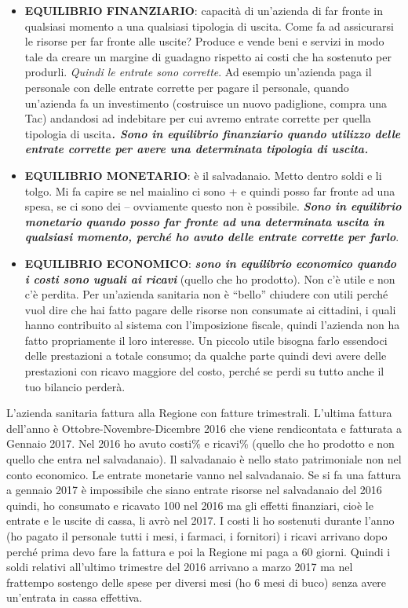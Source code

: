 \begin{itemize}
\item
  \textbf{EQUILIBRIO FINANZIARIO}: capacità di un'azienda di far fronte
  in qualsiasi momento a una qualsiasi tipologia di uscita. Come fa ad
  assicurarsi le risorse per far fronte alle uscite? Produce e vende
  beni e servizi in modo tale da creare un margine di guadagno rispetto
  ai costi che ha sostenuto per produrli. \emph{Quindi le entrate sono
  corrette}. Ad esempio un'azienda paga il personale con delle entrate
  corrette per pagare il personale, quando un'azienda fa un investimento
  (costruisce un nuovo padiglione, compra una Tac) andandosi ad
  indebitare per cui avremo entrate corrette per quella tipologia di
  uscita\textbf{\emph{. Sono in equilibrio finanziario quando utilizzo
  delle entrate corrette per avere una determinata tipologia di
  uscita.}}
\item
  \textbf{EQUILIBRIO MONETARIO}: è il salvadanaio. Metto dentro soldi e
  li tolgo. Mi fa capire se nel maialino ci sono + e quindi posso far
  fronte ad una spesa, se ci sono dei -- ovviamente questo non è
  possibile. \textbf{\emph{Sono in equilibrio monetario quando posso far
  fronte ad una determinata uscita in qualsiasi momento, perché ho avuto
  delle entrate corrette per farlo}}.
\item
  \textbf{EQUILIBRIO ECONOMICO}: \textbf{\emph{sono in equilibrio
  economico quando i costi sono uguali ai ricavi}} (quello che ho
  prodotto). Non c'è utile e non c'è perdita. Per un'azienda sanitaria
  non è ``bello'' chiudere con utili perché vuol dire che hai fatto
  pagare delle risorse non consumate ai cittadini, i quali hanno
  contribuito al sistema con l'imposizione fiscale, quindi l'azienda non
  ha fatto propriamente il loro interesse. Un piccolo utile bisogna
  farlo essendoci delle prestazioni a totale consumo; da qualche parte
  quindi devi avere delle prestazioni con ricavo maggiore del costo,
  perché se perdi su tutto anche il tuo bilancio perderà.
\end{itemize}

L'azienda sanitaria fattura alla Regione con fatture trimestrali.
L'ultima fattura dell'anno è Ottobre-Novembre-Dicembre 2016 che viene rendicontata e fatturata a Gennaio 2017. Nel 2016 ho avuto costi\% e ricavi\% (quello che ho prodotto e non quello che entra nel salvadanaio). Il salvadanaio è nello stato patrimoniale non nel conto economico. Le entrate monetarie vanno nel salvadanaio. Se si fa una fattura a gennaio 2017 è impossibile che siano entrate risorse nel salvadanaio del 2016 quindi, ho consumato e ricavato 100 nel 2016 ma gli effetti finanziari, cioè le entrate e le uscite di cassa, li avrò nel 2017. I costi li ho sostenuti durante l'anno (ho pagato il personale tutti i mesi, i farmaci, i fornitori) i ricavi arrivano dopo perché prima devo fare la fattura e poi la Regione mi paga a 60 giorni. Quindi i soldi relativi all'ultimo trimestre del 2016 arrivano a marzo 2017 ma nel frattempo sostengo delle spese per diversi mesi (ho 6 mesi di buco) senza avere un'entrata in cassa effettiva.


